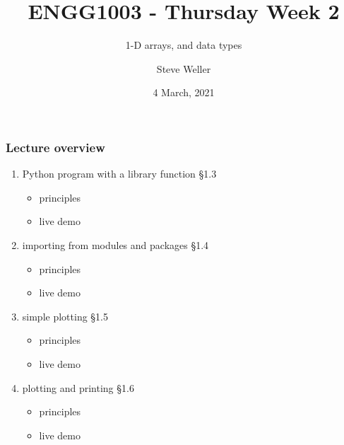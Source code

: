 \documentclass[14pt]{beamer}
\title{ENGG1003 - Thursday Week 2}
\subtitle{1-D arrays, and data types}
\author{Steve Weller}
\institute{University of Newcastle}
\date{4 March, 2021}
\newcommand\red[1]{{\color{red} #1}}
\begin{document}
\framebreak


\begin{frame}[fragile]

\frametitle{Lecture overview}
\begin{enumerate}
\item Python program with a library function \red{\S1.3}
	\begin{itemize}
		\item principles
		\item live demo
	\end{itemize}
\item importing from modules and packages \red{\S1.4}
		\begin{itemize}
		\item principles
		\item live demo
	\end{itemize}
	
\item simple plotting \red{\S1.5} 
	\begin{itemize}
			\item principles
		\item live demo
	\end{itemize}
	
\item plotting and printing \red{\S1.6}
	\begin{itemize}
	\item principles
	\item live demo
	\end{itemize}
\end{enumerate}

\end{frame}

\end{document}
